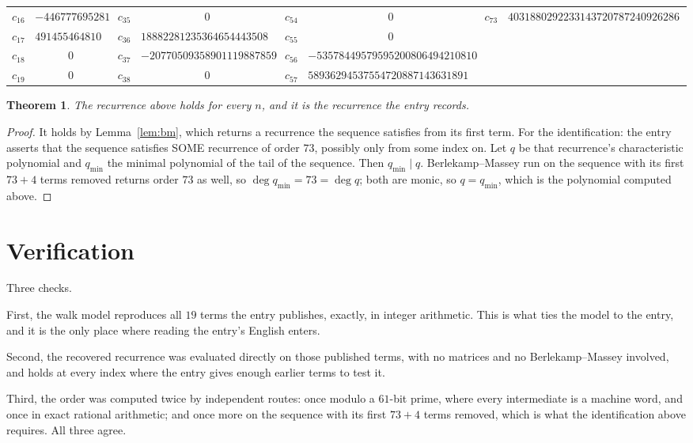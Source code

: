 \documentclass[11pt,a4paper]{article}
\theoremstyle{plain}
\newtheorem{theorem}{Theorem}
\theoremstyle{definition}
\begin{document}
\begin{center}
\begin{tabular}{cccccccc}
$c_{16}$ & $-446777695281960$ & $c_{35}$ & $0$ & $c_{54}$ & $0$ & $c_{73}$ & $403188029223314372078724092628685912533616$ \\
$c_{17}$ & $4914554648101560$ & $c_{36}$ & $18882281235364654443508906170$ & $c_{55}$ & $0$ &  &  \\
$c_{18}$ & $0$ & $c_{37}$ & $-207705093589011198878597967870$ & $c_{56}$ & $-53578449579595200806494210810043900460$ &  &  \\
$c_{19}$ & $0$ & $c_{38}$ & $0$ & $c_{57}$ & $589362945375547208871436318910482905060$ &  &  \\
\end{tabular}
\end{center}

\begin{theorem}
The recurrence above holds for every $n$, and it is the recurrence the entry records.
\end{theorem}

\begin{proof}
It holds by Lemma~\ref{lem:bm}, which returns a recurrence the sequence satisfies from its
first term. For the identification: the entry asserts that the sequence satisfies SOME
recurrence of order $73$, possibly only from some index on. Let $q$ be that recurrence's
characteristic polynomial and $q_{\min}$ the minimal polynomial of the tail of the sequence.
Then $q_{\min}\mid q$. Berlekamp--Massey run on the sequence with its first $73+4$ terms
removed returns order $73$ as well, so $\deg q_{\min}=73=\deg q$; both are monic, so
$q=q_{\min}$, which is the polynomial computed above.
\end{proof}

\section{Verification}

Three checks.

First, the walk model reproduces all $19$ terms the entry publishes, exactly, in integer
arithmetic. This is what ties the model to the entry, and it is the only place where reading
the entry's English enters.

Second, the recovered recurrence was evaluated directly on those published terms, with no
matrices and no Berlekamp--Massey involved, and holds at every index where the entry gives
enough earlier terms to test it.

Third, the order was computed twice by independent routes: once modulo a $61$-bit prime, where
every intermediate is a machine word, and once in exact rational arithmetic; and once more on
the sequence with its first $73+4$ terms removed, which is what the identification above
requires. All three agree.
\end{document}
